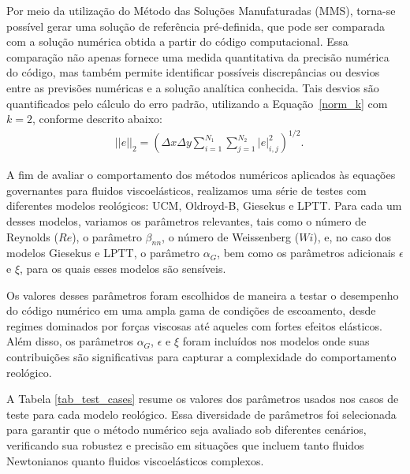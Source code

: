 Por meio da utilização do Método das Soluções Manufaturadas (MMS), torna-se possível gerar uma solução de referência pré-definida, que pode ser comparada com a solução numérica obtida a partir do código computacional. Essa comparação não apenas fornece uma medida quantitativa da precisão numérica do código, mas também permite identificar possíveis discrepâncias ou desvios entre as previsões numéricas e a solução analítica conhecida. Tais desvios são quantificados pelo cálculo do erro padrão, utilizando a Equação~\eqref{norm_k} com $k = 2$, conforme descrito abaixo:
\begin{align} 
    &||e||_{2}=\left( \Delta x \Delta y \sum_{i=1}^{N_{1}}\sum_{j=1}^{N_{2}} \left |e\right |_{i,j}^{2}\right)^{1/2}.\label{norm_2}
\end{align}

A fim de avaliar o comportamento dos métodos numéricos aplicados às equações governantes para fluidos viscoelásticos, realizamos uma série de testes com diferentes modelos reológicos: UCM, Oldroyd-B, Giesekus e LPTT. Para cada um desses modelos, variamos os parâmetros relevantes, tais como o número de Reynolds ($Re$), o parâmetro $\beta_{nn}$, o número de Weissenberg ($Wi$), e, no caso dos modelos Giesekus e LPTT, o parâmetro $\alpha_G$, bem como os parâmetros adicionais $\epsilon$ e $\xi$, para os quais esses modelos são sensíveis.

Os valores desses parâmetros foram escolhidos de maneira a testar o desempenho do código numérico em uma ampla gama de condições de escoamento, desde regimes dominados por forças viscosas até aqueles com fortes efeitos elásticos. Além disso, os parâmetros $\alpha_G$, $\epsilon$ e $\xi$ foram incluídos nos modelos onde suas contribuições são significativas para capturar a complexidade do comportamento reológico. 

A Tabela \ref{tab_test_cases} resume os valores dos parâmetros usados nos casos de teste para cada modelo reológico. Essa diversidade de parâmetros foi selecionada para garantir que o método numérico seja avaliado sob diferentes cenários, verificando sua robustez e precisão em situações que incluem tanto fluidos Newtonianos quanto fluidos viscoelásticos complexos.

